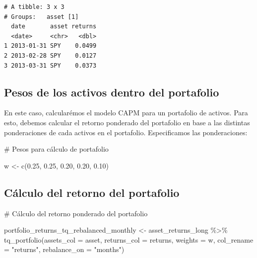 \documentclass[
  letterpaper,
  DIV=11,
  numbers=noendperiod]{scrartcl}
\newenvironment{Shaded}{\begin{snugshade}}{\end{snugshade}}
\newcommand{\AttributeTok}[1]{\textcolor[rgb]{0.40,0.45,0.13}{#1}}
\newcommand{\CommentTok}[1]{\textcolor[rgb]{0.37,0.37,0.37}{#1}}
\newcommand{\FloatTok}[1]{\textcolor[rgb]{0.68,0.00,0.00}{#1}}
\newcommand{\FunctionTok}[1]{\textcolor[rgb]{0.28,0.35,0.67}{#1}}
\newcommand{\NormalTok}[1]{\textcolor[rgb]{0.00,0.23,0.31}{#1}}
\newcommand{\OtherTok}[1]{\textcolor[rgb]{0.00,0.23,0.31}{#1}}
\newcommand{\SpecialCharTok}[1]{\textcolor[rgb]{0.37,0.37,0.37}{#1}}
\newcommand{\StringTok}[1]{\textcolor[rgb]{0.13,0.47,0.30}{#1}}
\begin{document}
\begin{verbatim}
# A tibble: 3 x 3
# Groups:   asset [1]
  date       asset returns
  <date>     <chr>   <dbl>
1 2013-01-31 SPY    0.0499
2 2013-02-28 SPY    0.0127
3 2013-03-31 SPY    0.0373
\end{verbatim}

\subsection{Pesos de los activos dentro del
portafolio}\label{pesos-de-los-activos-dentro-del-portafolio}

En este caso, calcularémos el modelo CAPM para un portafolio de activos.
Para esto, debemos calcular el retorno ponderado del portafolio en base
a las distintas ponderaciones de cada activos en el portafolio.
Especificamos las ponderaciones:

\begin{Shaded}
\begin{Highlighting}[]
\CommentTok{\# Pesos para cálculo de portafolio}

\NormalTok{w }\OtherTok{\textless{}{-}} \FunctionTok{c}\NormalTok{(}\FloatTok{0.25}\NormalTok{,}
       \FloatTok{0.25}\NormalTok{,}
       \FloatTok{0.20}\NormalTok{,}
       \FloatTok{0.20}\NormalTok{,}
       \FloatTok{0.10}\NormalTok{)}
\end{Highlighting}
\end{Shaded}

\subsection{Cálculo del retorno del
portafolio}\label{cuxe1lculo-del-retorno-del-portafolio}

\begin{Shaded}
\begin{Highlighting}[]
\CommentTok{\# Cálculo del retorno ponderado del portafolio}

\NormalTok{portfolio\_returns\_tq\_rebalanced\_monthly }\OtherTok{\textless{}{-}}
\NormalTok{  asset\_returns\_long }\SpecialCharTok{\%\textgreater{}\%}
  \FunctionTok{tq\_portfolio}\NormalTok{(}\AttributeTok{assets\_col =}\NormalTok{ asset,}
               \AttributeTok{returns\_col =}\NormalTok{ returns,}
               \AttributeTok{weights =}\NormalTok{ w,}
               \AttributeTok{col\_rename =} \StringTok{"returns"}\NormalTok{,}
               \AttributeTok{rebalance\_on =} \StringTok{"months"}\NormalTok{)}
\end{Highlighting}
\end{Shaded}
\end{document}
